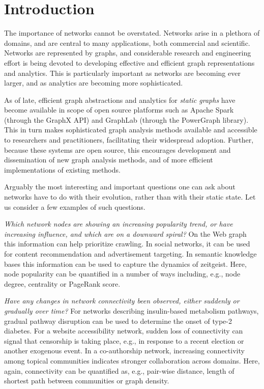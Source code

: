 \section{Introduction}
\label{sec:intro}

The importance of networks cannot be overstated. Networks arise in a
plethora of domains, and are central to many applications, both
commercial and scientific.  Networks are represented by graphs, and
considerable research and engineering effort is being devoted to
developing effective and efficient graph representations and
analytics.  This is particularly important as networks are becoming
ever larger, and as analytics are becoming more sophisticated.

As of late, efficient graph abstractions and analytics for {\em static
  graphs} have become available in scope of open source platforms such
as Apache Spark (through the GraphX API) and GraphLab (through the
PowerGraph library).  This in turn makes sophisticated graph analysis
methods available and accessible to researchers and practitioners,
facilitating their widespread adoption.  Further, because these
systems are open source, this encourages development and dissemination
of new graph analysis methods, and of more efficient implementations
of existing methods.

Arguably the most interesting and important questions one can ask
about networks have to do with their evolution, rather than with their
static state.  Let us consider a few examples of such questions.

{\em Which network nodes are showing an increasing popularity trend,
  or have increasing influence, and which are on a downward spiral?}
On the Web graph this information can help prioritize crawling.  In
social networks, it can be used for content recommendation and
advertisement targeting.  In semantic knowledge bases this information
can be used to capture the dynamics of zeitgeist.  Here, node
popularity can be quantified in a number of ways including, e.g., node
degree, centrality or PageRank score.

{\em Have any changes in network connectivity been observed, either
  suddenly or gradually over time?}  For networks describing
insulin-based metabolism pathways, gradual pathway disruption can be
used to determine the onset of type-2 diabetes.  For a website
accessibility network, sudden loss of connectivity can signal that
censorship is taking place, e.g., in response to a recent election or
another exogenous event.  In a co-authorship network, increasing
connectivity among topical communities indicates stronger
collaboration across domains.  Here, again, connectivity can be
quantified as, e.g., pair-wise distance, length of shortest path
between communities or graph density.

